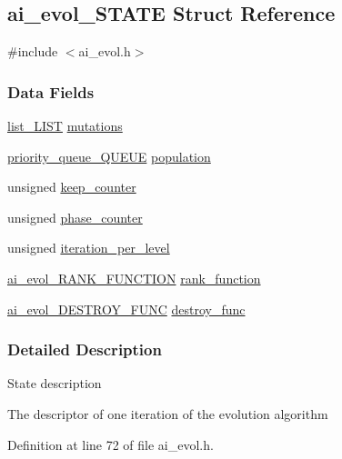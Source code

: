 \hypertarget{a00003}{\subsection{ai\-\_\-evol\-\_\-\-S\-T\-A\-T\-E Struct Reference}
\label{a00003}
}


{\ttfamily \#include $<$ai\-\_\-evol.\-h$>$}

\subsubsection*{Data Fields}
\begin{DoxyCompactItemize}
\item 
\hyperlink{a00004}{list\-\_\-\-L\-I\-S\-T} \hyperlink{a00003_a1ecc1cb59a98ecb473aaa3f9bece314c}{mutations}
\item 
\hyperlink{a00007}{priority\-\_\-queue\-\_\-\-Q\-U\-E\-U\-E} \hyperlink{a00003_a729b9f6da125fae3a756808aa6800b12}{population}
\item 
unsigned \hyperlink{a00003_a5583418f98233aa7dc9ce809fc68373f}{keep\-\_\-counter}
\item 
unsigned \hyperlink{a00003_aebb7070e519b1dfc35290d56844f52a7}{phase\-\_\-counter}
\item 
unsigned \hyperlink{a00003_a09b8e0c8752408132713a22b60f654e4}{iteration\-\_\-per\-\_\-level}
\item 
\hyperlink{a00008_a40f90c3ffcebe63f84cf844eea9167c5}{ai\-\_\-evol\-\_\-\-R\-A\-N\-K\-\_\-\-F\-U\-N\-C\-T\-I\-O\-N} \hyperlink{a00003_aaa7bfad69e416dc6acb8b7fb1e9689ab}{rank\-\_\-function}
\item 
\hyperlink{a00008_a6710253499441c289fb8751c83221e38}{ai\-\_\-evol\-\_\-\-D\-E\-S\-T\-R\-O\-Y\-\_\-\-F\-U\-N\-C} \hyperlink{a00003_a910eede8e95d587194d5e389f7ea0589}{destroy\-\_\-func}
\end{DoxyCompactItemize}


\subsubsection{Detailed Description}
State description

The descriptor of one iteration of the evolution algorithm 

Definition at line 72 of file ai\-\_\-evol.\-h.



